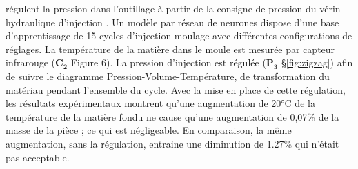 \citeauthor{michaeli_online_2009} régulent la pression dans l'outillage à partir de la consigne de pression du vérin hydraulique d’injection \cite{michaeli_online_2009}.
Un modèle par réseau de neurones dispose d'une base d'apprentissage de 15 cycles d’injection-moulage avec différentes configurations de réglages.
La température de la matière dans le moule est mesurée par capteur infrarouge ($\boldsymbol{C_2}$ Figure 6).
La pression d'injection est régulée ($\boldsymbol{P_3}$ §\ref{fig:zigzag}) afin de suivre le diagramme Pression-Volume-Température, de transformation du matériau pendant l'ensemble du cycle.
Avec la mise en place de cette régulation, les résultats expérimentaux  montrent qu’une augmentation de 20°C de la température de la matière fondu ne cause qu'une augmentation de 0,07\% de la masse de la pièce ; ce qui est négligeable.
En comparaison, la même augmentation, sans la régulation, entraine une diminution de 1.27\% qui n'était pas acceptable.

